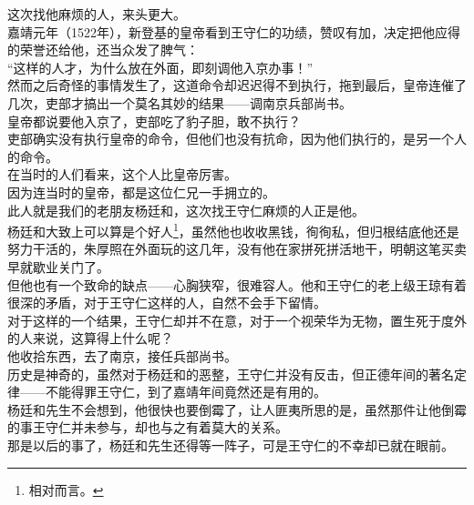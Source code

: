 \begin{multicols}{\theparacolNo}
这次找他麻烦的人，来头更大。\\

嘉靖元年（1522年），新登基的皇帝看到王守仁的功绩，赞叹有加，决定把他应得的荣誉还给他，还当众发了脾气：\\

“这样的人才，为什么放在外面，即刻调他入京办事！”\\

然而之后奇怪的事情发生了，这道命令却迟迟得不到执行，拖到最后，皇帝连催了几次，吏部才搞出一个莫名其妙的结果——调南京兵部尚书。\\

皇帝都说要他入京了，吏部吃了豹子胆，敢不执行？\\

吏部确实没有执行皇帝的命令，但他们也没有抗命，因为他们执行的，是另一个人的命令。\\

在当时的人们看来，这个人比皇帝厉害。\\

因为连当时的皇帝，都是这位仁兄一手拥立的。\\

此人就是我们的老朋友杨廷和，这次找王守仁麻烦的人正是他。\\

杨廷和大致上可以算是个好人\footnote{相对而言。}，虽然他也收收黑钱，徇徇私，但归根结底他还是努力干活的，朱厚照在外面玩的这几年，没有他在家拼死拼活地干，明朝这笔买卖早就歇业关门了。\\

但他也有一个致命的缺点——心胸狭窄，很难容人。他和王守仁的老上级王琼有着很深的矛盾，对于王守仁这样的人，自然不会手下留情。\\

对于这样的一个结果，王守仁却并不在意，对于一个视荣华为无物，置生死于度外的人来说，这算得上什么呢？\\

他收拾东西，去了南京，接任兵部尚书。\\

历史是神奇的，虽然对于杨廷和的恶整，王守仁并没有反击，但正德年间的著名定律——不能得罪王守仁，到了嘉靖年间竟然还是有用的。\\

杨廷和先生不会想到，他很快也要倒霉了，让人匪夷所思的是，虽然那件让他倒霉的事王守仁并未参与，却也与之有着莫大的关系。\\

那是以后的事了，杨廷和先生还得等一阵子，可是王守仁的不幸却已就在眼前。\\


\end{multicols}

